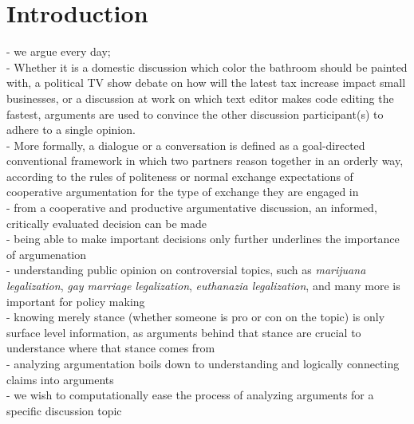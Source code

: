 \chapter{Introduction}

- we argue every day; \\
- Whether it is a domestic discussion which color the bathroom should 
be painted with, a political TV show debate on how will the latest tax increase 
impact small businesses, or a discussion at work on which text editor makes
code editing the fastest, arguments are used to convince the other discussion 
participant(s) to adhere to a single opinion. \\
- More formally, a dialogue or a conversation is defined as a goal-directed
conventional framework in which two partners reason 
together in an orderly way, 
according to the rules of politeness or normal exchange expectations
of cooperative argumentation for the type of exchange they are
engaged in \citep{walton1998new} \\
- from a cooperative and productive argumentative discussion, 
an informed, critically evaluated decision can be made \\
- being able to make important decisions only further 
underlines the importance of argumenation \\
- understanding public opinion on controversial topics, such as 
\textit{marijuana legalization}, \textit{gay marriage legalization}, 
\textit{euthanazia legalization}, and many more is important for
policy making \\
- knowing merely stance (whether someone is pro or con on the topic)
is only surface level information, as arguments behind that stance are
crucial to understance where that stance comes from \\
- analyzing argumentation boils down to understanding and logically connecting
claims into arguments \\
- we wish to computationally ease the process of analyzing arguments for a 
specific discussion topic \\


